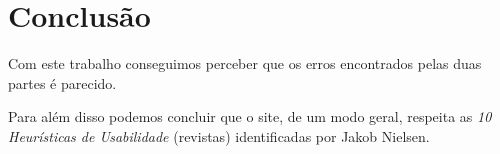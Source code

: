 \documentclass[11pt]{article}
\begin{document}
	\large
	\section{Conclusão}
	
	\normalsize
	Com este trabalho conseguimos perceber que os erros encontrados pelas duas partes é parecido.
	
	Para além disso podemos concluir que o site, de um modo geral, respeita as \textit{10 Heurísticas de Usabilidade} (revistas) identificadas por Jakob Nielsen.
\end{document}
